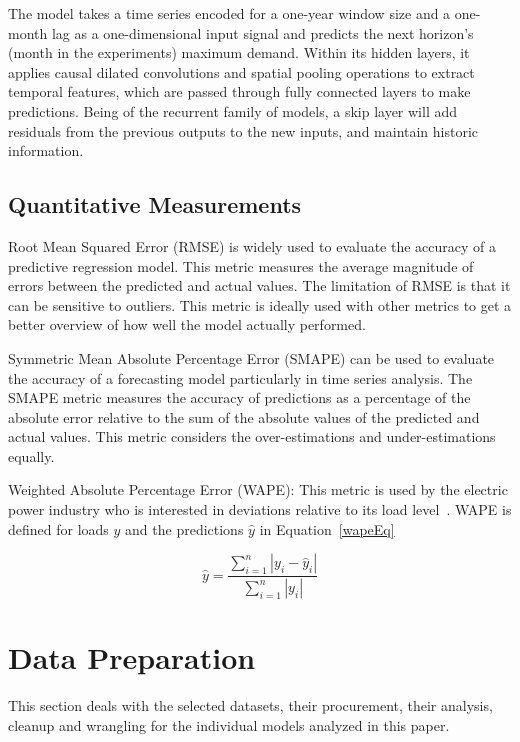 \documentclass{ieeeaccess}
\begin{document}
The model takes a time series encoded for a one-year window size and a one-month lag as a one-dimensional input signal and predicts the next horizon's (month in the experiments) maximum demand. Within its hidden layers, it applies causal dilated convolutions and spatial pooling operations to extract temporal features, which are passed through fully connected layers to make predictions. Being of the recurrent family of models, a skip layer will add residuals from the previous outputs to the new inputs, and maintain historic information.

\subsection{Quantitative Measurements}

Root Mean Squared Error (RMSE) is widely used to evaluate the accuracy of a predictive regression model. This metric measures the average magnitude of errors between the predicted and actual values. The limitation of RMSE is that it can be sensitive to outliers. This metric is ideally used with other metrics to get a better overview of how well the model actually performed.

Symmetric Mean Absolute Percentage Error (SMAPE) can be used to evaluate the accuracy of a forecasting model particularly in time series analysis. The SMAPE metric measures the accuracy of predictions as a percentage of the absolute error relative to the sum of the absolute values of the predicted and actual values. This metric considers the over-estimations and under-estimations equally.

Weighted Absolute Percentage Error (WAPE): This metric is used by the electric power industry who is interested in deviations relative to its load level~\cite{Benitez2020}. WAPE is defined for loads $y$ and the predictions $\hat{y}$ in Equation~\ref{wapeEq} 

\begin{equation}
 \label{wapeEq}
     \hat{y}= \frac{\sum_{i=1}^{n} |y_i - \hat{y}_i|}{\sum_{i=1}^{n} |y_i|} 
\end{equation}


\section{Data Preparation}
\label{sec:data}
This section deals with the selected datasets, their procurement, their analysis, cleanup and wrangling for the individual models analyzed in this paper.
\end{document}
